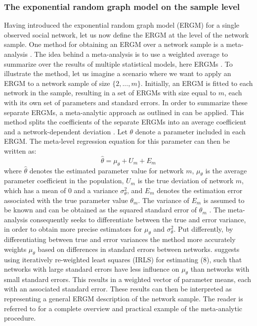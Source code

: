 \documentclass[a4paper, man]{apa6}
\begin{document}
\subsubsection{The exponential random graph model on the sample level}
Having introduced the exponential random graph model (ERGM) for a single observed social network, let us now define the ERGM at the level of the network sample. One method for obtaining an ERGM over a network sample is a meta-analysis \cite{lubbers2003group}. The idea behind a meta-analysis is to use a weighted average to summarize over the results of multiple statistical models, here ERGMs \cite{lubbers2003group}. To illustrate the method, let us imagine a scenario where we want to apply an ERGM to a network sample of size $\{2, ..., m\}$. \clearpage \noindent Initially, an ERGM is fitted to each network in the sample, resulting in a set of ERGMs with size equal to $m$, each with its own set of parameters and standard errors. In order to summarize these separate ERGMs, a meta-analytic approach as outlined in  can be applied. This method splits the coefficients of the separate ERGMs into an average coefficient and a network-dependent deviation \cite{lubbers2003group}. Let $\theta$ denote a parameter included in each ERGM. The meta-level regression equation for this parameter can then be written as: \begin{equation} \hat{\theta} = \mu_{\theta} + U_{m} + E_{m} \end{equation} where $\hat{\theta}$ denotes the estimated parameter value for network $m$, $\mu_{\theta}$ is the average parameter coefficient in the population, $U_{m}$ is the true deviation of network $m$, which has a mean of 0 and a variance $\sigma^{2}_{\theta}$, and $E_{m}$ denotes the estimation error associated with the true parameter value $\theta_{m}$. The variance of $E_{m}$ is assumed to be known and can be obtained as the squared standard error of $\theta_{m}$ \cite{lubbers2003group}. The meta-analysis consequently seeks to differentiate between the true and error variance, in order to obtain more precise estimators for $\mu_{\theta}$ and $\sigma^{2}_{\theta}$. Put differently, by differentiating between true and error variances the method more accurately weights $\mu_{\theta}$ based on differences in standard errors between networks.  suggests using iteratively re-weighted least squares (IRLS) for estimating (8), such that networks with large standard errors have less influence on $\mu_{\theta}$ than networks with small standard errors. This results in a weighted vector of parameter means, each with an associated standard error. These results can then be interpreted as representing a general ERGM description of the network sample. The reader is referred to  for a complete overview and practical example of the meta-analytic procedure.
\\
\end{document}
